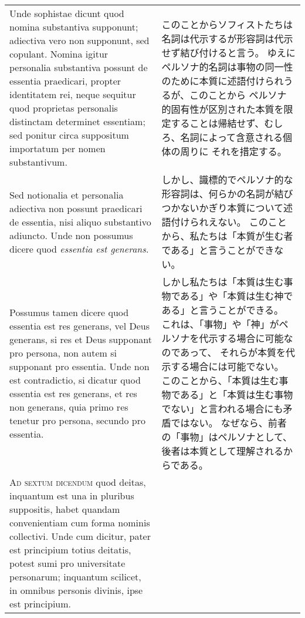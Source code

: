 \documentclass[10pt]{jsarticle} %
\begin{document}
\begin{longtable}{p{21em}p{21em}}
Unde sophistae dicunt quod
nomina substantiva supponunt; adiectiva vero non supponunt, sed copulant.
Nomina igitur personalia substantiva possunt de essentia praedicari, propter
identitatem rei, neque sequitur quod proprietas personalis distinctam
determinet essentiam; sed ponitur circa suppositum importatum per nomen
substantivum. 



&

このことからソフィストたちは名詞は代示するが形容詞は代示せず結び付けると言う。
ゆえにペルソナ的名詞は事物の同一性のために本質に述語付けられうるが、このことから
ペルソナ的固有性が区別された本質を限定することは帰結せず、むしろ、名詞によって含意される個体の周りに
それを措定する。
\\

Sed notionalia et personalia adiectiva non possunt praedicari de
essentia, nisi aliquo substantivo adiuncto. Unde non possumus dicere quod
\textit{essentia est generans}. 

&

しかし、識標的でペルソナ的な形容詞は、何らかの名詞が結びつかないかぎり本質について述語付けられえない。
このことから、私たちは「本質が生む者である」と言うことができない。
\\

Possumus tamen dicere quod essentia est res generans,
vel Deus generans, si res et Deus supponant pro persona, non autem si supponant
pro essentia. Unde non est contradictio, si dicatur quod essentia est res
generans, et res non generans, quia primo res tenetur pro persona, secundo pro
essentia.


&

しかし私たちは「本質は生む事物である」や「本質は生む神である」と言うことができる。
これは、「事物」や「神」がペルソナを代示する場合に可能なのであって、
それらが本質を代示する場合には可能でない。
このことから、「本質は生む事物である」と「本質は生む事物でない」と言われる場合にも矛盾ではない。
なぜなら、前者の「事物」はペルソナとして、後者は本質として理解されるからである。

\\


\textsc{Ad sextum dicendum} quod deitas, inquantum est una in pluribus suppositis, habet
quandam convenientiam cum forma nominis collectivi. Unde cum dicitur, pater est
principium totius deitatis, potest sumi pro universitate personarum; inquantum
scilicet, in omnibus personis divinis, ipse est principium. 


&


\end{longtable}
\end{document}
